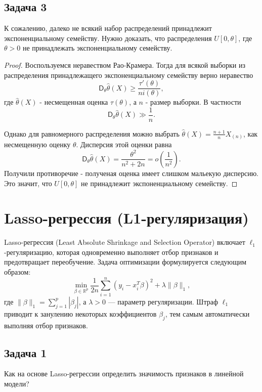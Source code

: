 \subsection*{Задача 3}

К сожалению, далеко не всякий набор распределений принадлежит экспоненциальному семейству. Нужно доказать, что распределения
$U[0, \theta]$, где $\theta > 0$ не принадлежать экспоненциальному семейству.

\begin{proof}
  Воспользуемся неравеством Рао-Крамера. Тогда для всякой выборки из распределения принадлежащего экспоненциальному семейству верно неравество
  $$
  \mathsf{D}_\theta \widehat\theta(X) \geq \frac{\tau'(\theta)}{ni(\theta)},
  $$
  где $\widehat\theta(X)$ - несмещенная оценка $\tau(\theta)$, а $n$ - размер выборки.
  В частности
  $$\mathsf{D}_\theta \widehat\theta(X) \gg \frac{1}{n}.$$
  
  Однако для равномерного распределения можно выбрать $\widehat\theta(X) = \frac{n+1}{n} X_{(n)}$, как несмещенную оценку $\theta$. Дисперсия этой оценки равна
  $$
  \mathsf{D}_\theta \widehat\theta(X) = \frac{\theta^2}{n^2 + 2n} = o\left(\frac{1}{n^2}\right).
  $$
  Получили противоречие - полученая оценка имеет слишком мальекую дисперсию. Это значит, что $U[0, \theta]$ не принадлежит экспоненциальному семейству.
\end{proof}


\section*{Lasso-регрессия (L1-регуляризация)}

Lasso-регрессия (Least Absolute Shrinkage and Selection Operator) включает $\ell_1$-регуляризацию, которая одновременно выполняет отбор признаков и предотвращает переобучение. Задача оптимизации формулируется следующим образом:
\[
\min_{\beta \in \mathbb{R}^p} \frac{1}{2n} \sum_{i=1}^n (y_i - x_i^T \beta)^2 + \lambda \|\beta\|_1,
\]
где $\|\beta\|_1 = \sum_{j=1}^p |\beta_j|$, а $\lambda > 0$ — параметр регуляризации. Штраф $\ell_1$ приводит к занулению некоторых коэффициентов $\beta_j$, тем самым автоматически выполняя отбор признаков.

\subsection*{Задача 1}
Как на основе Lasso-регрессии определить значимость признаков в линейной модели? 


